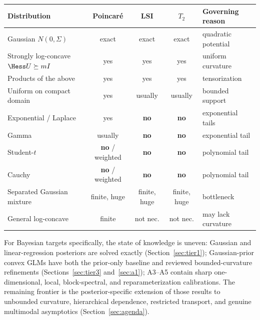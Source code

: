 \documentclass[../main.tex]{subfiles}
\begin{document}
\begin{center}
\begin{tabularx}{\textwidth}{@{}p{} c c c Y@{}}
\toprule
Distribution & Poincar\'e & LSI & $T_2$ & Governing reason\\
\midrule
Gaussian $N(0,\Sigma)$              & exact & exact & exact & quadratic potential\\
Strongly log-concave $\Hess U\succeq mI$ & yes & yes & yes & uniform curvature\\
Products of the above               & yes & yes & yes & tensorization\\
Uniform on compact domain           & yes & usually & usually & bounded support\\
Exponential / Laplace               & yes & \textbf{no} & \textbf{no} & exponential tails\\
Gamma                               & usually & \textbf{no} & \textbf{no} & exponential tail\\
Student-$t$                         & \textbf{no} / weighted & \textbf{no} & \textbf{no} & polynomial tail\\
Cauchy                              & \textbf{no} / weighted & \textbf{no} & \textbf{no} & polynomial tail\\
Separated Gaussian mixture          & finite, huge & finite, huge & finite, huge & bottleneck\\
General log-concave                 & finite & not nec. & not nec. & may lack curvature\\
\bottomrule
\end{tabularx}
\end{center}

For Bayesian targets specifically, the state of knowledge is uneven: Gaussian and
linear-regression posteriors are solved exactly (Section~\ref{sec:tier1}); Gaussian-prior convex
GLMs have both the prior-only baseline and reviewed bounded-curvature refinements
(Sections~\ref{sec:tier3} and~\ref{sec:a1}); A3--A5 contain sharp one-dimensional, local,
block-spectral, and reparameterization calibrations. The remaining frontier is the
posterior-specific extension of those results to unbounded curvature, hierarchical dependence,
restricted transport, and genuine multimodal asymptotics (Section~\ref{sec:agenda}).
\end{document}

